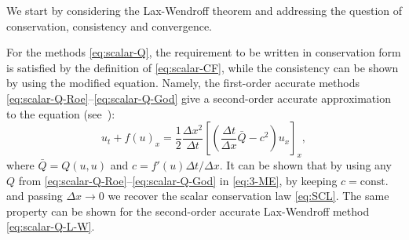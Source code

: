 We start by considering the Lax-Wendroff theorem and addressing the question of conservation, consistency and convergence. 

For the methods \eqref{eq:scalar-Q}, the requirement to be written in conservation form is satisfied by the definition of \eqref{eq:scalar-CF}, while the consistency can be shown by using the modified equation. Namely, the first-order accurate methods \eqref{eq:scalar-Q-Roe}--\eqref{eq:scalar-Q-God} give a second-order accurate approximation to the equation (see~\cite{lin16}):
\begin{equation} \label{eq:3-ME}
u_t + f(u)_x = \frac{1}{2} \frac{\Delta x^2}{\Delta t} \left[ \left( \frac{\Delta t}{\Delta x} \bar{Q} - c^2 \right) u_x \right]_x,
\end{equation}
where $ \bar{Q} = Q \left( u, u \right) $ and $ c = f'(u) \Delta t / \Delta x $. It can be shown that by using any $ Q $ from \eqref{eq:scalar-Q-Roe}--\eqref{eq:scalar-Q-God} in \eqref{eq:3-ME}, by keeping $ c=\text{const.} $ and passing $ \Delta x \rightarrow 0 $ we recover the scalar conservation law \eqref{eq:SCL}. The same property can be shown for the second-order accurate Lax-Wendroff method \eqref{eq:scalar-Q-L-W}.

